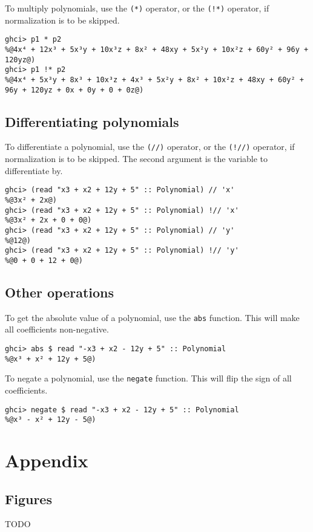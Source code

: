 \documentclass[11pt,a4paper]{article}
\begin{document}
To multiply polynomials, use the \lstinline{(*)} operator, or the \lstinline{(!*)} operator, if normalization is to be skipped.

\begin{lstlisting}
ghci> p1 * p2
%@4x⁴ + 12x³ + 5x³y + 10x³z + 8x² + 48xy + 5x²y + 10x²z + 60y² + 96y + 120yz@)
ghci> p1 !* p2
%@4x⁴ + 5x³y + 8x³ + 10x³z + 4x³ + 5x²y + 8x² + 10x²z + 48xy + 60y² + 96y + 120yz + 0x + 0y + 0 + 0z@)
\end{lstlisting}

\subsection{Differentiating polynomials}

To differentiate a polynomial, use the \lstinline{(//)} operator, or the \lstinline{(!//)} operator, if normalization is to be skipped.
The second argument is the variable to differentiate by.

\begin{lstlisting}
ghci> (read "x3 + x2 + 12y + 5" :: Polynomial) // 'x'
%@3x² + 2x@)
ghci> (read "x3 + x2 + 12y + 5" :: Polynomial) !// 'x'
%@3x² + 2x + 0 + 0@)
ghci> (read "x3 + x2 + 12y + 5" :: Polynomial) // 'y'
%@12@)
ghci> (read "x3 + x2 + 12y + 5" :: Polynomial) !// 'y'
%@0 + 0 + 12 + 0@)
\end{lstlisting}

\subsection{Other operations}

To get the absolute value of a polynomial, use the \lstinline{abs} function.
This will make all coefficients non-negative.

\begin{lstlisting}
ghci> abs $ read "-x3 + x2 - 12y + 5" :: Polynomial
%@x³ + x² + 12y + 5@)
\end{lstlisting}

To negate a polynomial, use the \lstinline{negate} function.
This will flip the sign of all coefficients.

\begin{lstlisting}
ghci> negate $ read "-x3 + x2 - 12y + 5" :: Polynomial
%@x³ - x² + 12y - 5@)
\end{lstlisting}

\pagebreak

\appendix
\section{Appendix}

\subsection{Figures}

TODO
\end{document}
